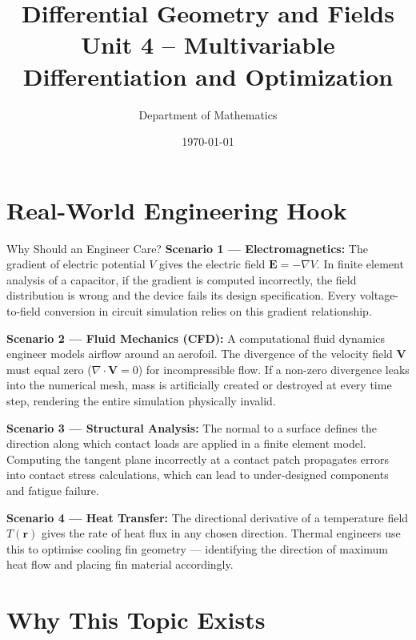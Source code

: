 \documentclass[12pt,a4paper]{article}
\title{\textbf{Differential Geometry and Fields} \\ \large Unit 4 -- Multivariable Differentiation and Optimization}
\author{Department of Mathematics}
\date{\today}
\begin{document}
\maketitle
\tableofcontents
\newpage

\section{Real-World Engineering Hook}

\begin{curiositybox}{Why Should an Engineer Care?}
\textbf{Scenario 1 --- Electromagnetics:} The gradient of electric potential $V$ gives the electric field $\mathbf{E} = -\nabla V$. In finite element analysis of a capacitor, if the gradient is computed incorrectly, the field distribution is wrong and the device fails its design specification. Every voltage-to-field conversion in circuit simulation relies on this gradient relationship.

\vspace{6pt}
\textbf{Scenario 2 --- Fluid Mechanics (CFD):} A computational fluid dynamics engineer models airflow around an aerofoil. The divergence of the velocity field $\mathbf{V}$ must equal zero ($\nabla \cdot \mathbf{V} = 0$) for incompressible flow. If a non-zero divergence leaks into the numerical mesh, mass is artificially created or destroyed at every time step, rendering the entire simulation physically invalid.

\vspace{6pt}
\textbf{Scenario 3 --- Structural Analysis:} The normal to a surface defines the direction along which contact loads are applied in a finite element model. Computing the tangent plane incorrectly at a contact patch propagates errors into contact stress calculations, which can lead to under-designed components and fatigue failure.

\vspace{6pt}
\textbf{Scenario 4 --- Heat Transfer:} The directional derivative of a temperature field $T(\mathbf{r})$ gives the rate of heat flux in any chosen direction. Thermal engineers use this to optimise cooling fin geometry --- identifying the direction of maximum heat flow and placing fin material accordingly.
\end{curiositybox}

\section{Why This Topic Exists}
\end{document}
